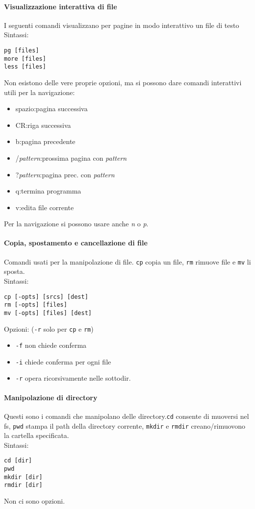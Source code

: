 \documentclass[a4paper, 10pt]{article}
\begin{document}
\paragraph{Visualizzazione interattiva di file}I seguenti comandi visualizzano per pagine in modo interattivo un file di testo \\
Sintassi:
\begin{verbatim}
pg [files]
more [files]
less [files]
\end{verbatim}

Non esistono delle vere proprie opzioni, ma si possono dare comandi interattivi utili per la navigazione:
\begin{itemize}
\item spazio:pagina successiva
\item CR:riga successiva
\item b:pagina precedente
\item /\textit{pattern}:prossima pagina con \textit{pattern}
\item ?\textit{pattern}:pagina prec. con \textit{pattern}
\item q:termina programma
\item v:edita file corrente
\end{itemize}
Per la navigazione si possono usare anche \textit{n} o \textit{p}.

\paragraph{Copia, spostamento e cancellazione di file} Comandi usati per la manipolazione di file. \verb|cp| copia un file, \verb|rm| rimuove file e \verb|mv| li sposta.\\
Sintassi:
\begin{verbatim}
cp [-opts] [srcs] [dest]
rm [-opts] [files]
mv [-opts] [files] [dest]
\end{verbatim}
Opzioni: (\verb|-r| solo per \verb|cp| e \verb|rm|)
\begin{itemize}
\item \verb|-f| non chiede conferma
\item \verb|-i| chiede conferma per ogni file
\item \verb|-r| opera ricorsivamente nelle sottodir.
\end{itemize}

\paragraph{Manipolazione di directory} Questi sono i comandi che manipolano delle directory.\verb|cd| consente di muoversi nel fs, \verb|pwd| stampa il path della directory corrente, \verb|mkdir| e \verb|rmdir| creano/rimuovono la cartella specificata.\\
Sintassi:
\begin{verbatim}
cd [dir]
pwd
mkdir [dir]
rmdir [dir]
\end{verbatim}
Non ci sono opzioni.
\end{document}
